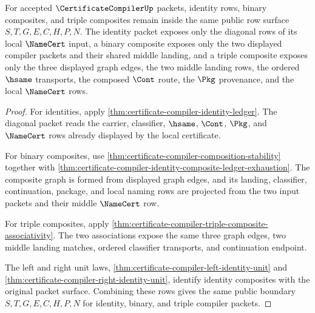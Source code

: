 \begin{theorem}
\label{thm:certificate-compiler-identity-composite-public-boundary}
For accepted $\CertificateCompilerUp$ packets, identity rows, binary
composites, and triple composites remain inside the same public row surface
$S,T,G,E,C,H,P,N$. The identity packet exposes only the diagonal rows of its
local $\NameCert$ input, a binary composite exposes only the two displayed
compiler packets and their shared middle landing, and a triple composite
exposes only the three displayed graph edges, the two middle landing rows,
the ordered $\hsame$ transports, the composed $\Cont$ route, the $\Pkg$
provenance, and the local $\NameCert$ rows.
\end{theorem}
\begin{proof}
For identities, apply
\autoref{thm:certificate-compiler-identity-ledger}. The diagonal packet reads
the carrier, classifier, $\hsame$, $\Cont$, $\Pkg$, and $\NameCert$ rows
already displayed by the local certificate.

For binary composites, use
\autoref{thm:certificate-compiler-composition-stability} together with
\autoref{thm:certificate-compiler-identity-composite-ledger-exhaustion}. The
composite graph is formed from displayed graph edges, and its landing,
classifier, continuation, package, and local naming rows are projected from
the two input packets and their middle $\NameCert$ row.

For triple composites, apply
\autoref{thm:certificate-compiler-triple-composite-associativity}. The two
associations expose the same three graph edges, two middle landing matches,
ordered classifier transports, and continuation endpoint.

The left and right unit laws,
\autoref{thm:certificate-compiler-left-identity-unit} and
\autoref{thm:certificate-compiler-right-identity-unit}, identify identity
composites with the original packet surface. Combining these rows gives the
same public boundary $S,T,G,E,C,H,P,N$ for identity, binary, and triple
compiler packets.
\end{proof}


